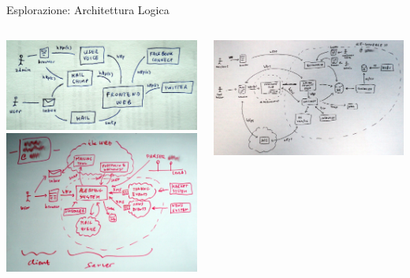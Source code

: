 	\begin{frame}{Esplorazione: Architettura Logica}
		\begin{columns}[T]
		    \begin{column}{.5\textwidth}
				\includegraphics[scale=0.13]{images/architecture-2}
				\\ \vspace*{0.2cm}
				\includegraphics[scale=0.135]{images/architecture-3}
		    \end{column}
		    \begin{column}{.5\textwidth}
				\includegraphics[scale=0.13]{images/architecture-5}

\end{column}
\end{columns}
\end{frame}
